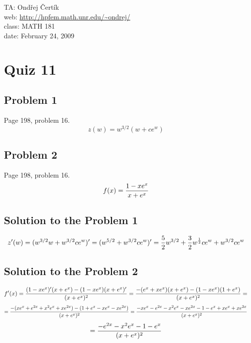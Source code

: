 \documentclass[10pt]{article}
\begin{document}
\noindent TA: Ondřej Čertík\\
web: \url{http://hpfem.math.unr.edu/~ondrej/}\\
class: MATH 181\\
date: February 24, 2009

\section*{Quiz 11}

\subsection*{Problem 1}

Page 198, problem 16.
$$z(w) =   w ^ {3/2} (w + c e^w)$$

\subsection*{Problem 2}

Page 198, problem 16.
$$f(x) = {1-xe^x\over x+e^x}$$

\subsection*{Solution to the Problem 1}

$$z'(w) = (w^{3/2} w + w^{3/2}ce^w)'=(w^{5/2}+w^{3/2}ce^w)'
={5\over2}w^{3/2}+{3\over2}w^{1\over2} c e^w + w^{3/2}ce^w$$

\subsection*{Solution to the Problem 2}

$$f'(x) = {(1-xe^x)'(x+e^x)-(1-xe^x)(x+e^x)'\over(x+e^x)^2}
={-(e^x+xe^x)(x+e^x)-(1-xe^x)(1+e^x)\over(x+e^x)^2}=
$$
$$
={-(xe^x+e^{2x}+x^2e^x+xe^{2x})-(1+e^x-xe^x-xe^{2x})\over(x+e^x)^2}
={-xe^x-e^{2x}-x^2e^x-xe^{2x}-1-e^x+xe^x+xe^{2x}\over(x+e^x)^2}
$$
$$
={-e^{2x}-x^2e^x-1-e^x\over(x+e^x)^2}
$$
\end{document}
